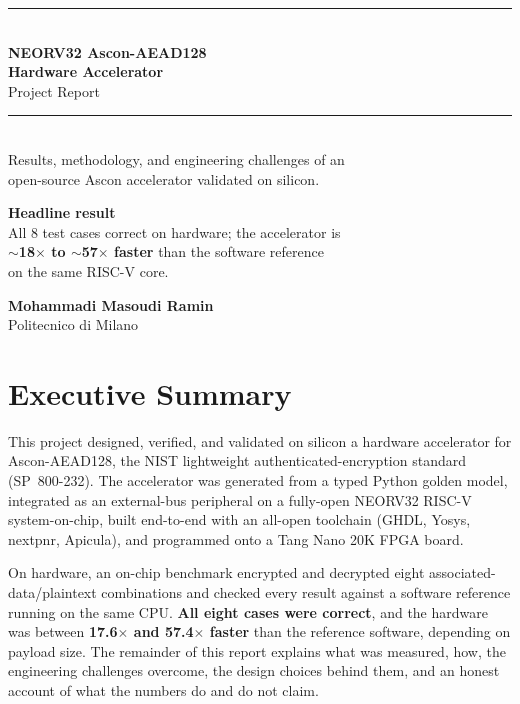 \documentclass[11pt,a4paper]{article}
\begin{document}

\begin{titlepage}
\centering
\vspace*{2.5cm}
{\color{docblue}\rule{\linewidth}{1.2pt}}\\[0.6cm]
{\Huge\bfseries\color{docblue} NEORV32 Ascon-AEAD128\\[0.2cm] Hardware Accelerator}\\[0.4cm]
{\LARGE\color{doclblue} Project Report}\\[0.3cm]
{\color{docblue}\rule{\linewidth}{1.2pt}}\\[1.2cm]
{\large Results, methodology, and engineering challenges of an\\
open-source Ascon accelerator validated on silicon.}\\[1.6cm]
\begin{tcolorbox}[width=0.8\linewidth, colback=nfrbg, colframe=nfrframe,
  halign=center, arc=3pt]
{\large\bfseries\color{nfrframe} Headline result}\\[2pt]
All 8 test cases correct on hardware; the accelerator is\\
\textbf{$\sim$18$\times$ to $\sim$57$\times$ faster} than the software reference\\
on the same RISC-V core.
\end{tcolorbox}
\par\vspace{1.6cm}
{\large\textbf{Mohammadi Masoudi Ramin}}\\[0.3cm]
{\normalsize Politecnico di Milano}\\
\vfill
\end{titlepage}

\tableofcontents
\newpage

\section{Executive Summary}
This project designed, verified, and validated on silicon a hardware accelerator
for Ascon-AEAD128, the NIST lightweight authenticated-encryption standard
(SP~800-232). The accelerator was generated from a typed Python golden model,
integrated as an external-bus peripheral on a fully-open NEORV32 RISC-V
system-on-chip, built end-to-end with an all-open toolchain (GHDL, Yosys,
nextpnr, Apicula), and programmed onto a Tang Nano 20K FPGA board.

On hardware, an on-chip benchmark encrypted and decrypted eight
associated-data/plaintext combinations and checked every result against a
software reference running on the same CPU. \textbf{All eight cases were correct},
and the hardware was between \textbf{17.6$\times$ and 57.4$\times$ faster} than the
reference software, depending on payload size. The remainder of this report
explains what was measured, how, the engineering challenges overcome, the design
choices behind them, and an honest account of what the numbers do and do not
claim.
\end{document}
